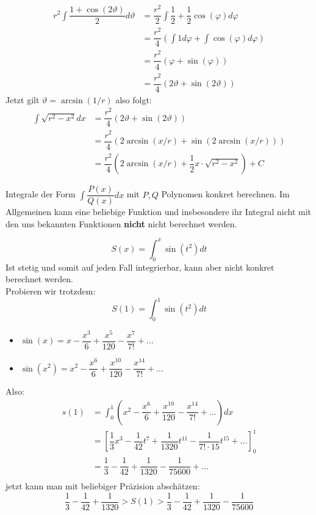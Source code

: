 \documentclass[main.tex]{subfiles}
\begin{document}
\begin{Beispiel}
\begin{itemize}
      \begin{align*}
        r^2 \int \dfrac{1 + \cos(2\vartheta)}{2} d \vartheta &= \dfrac{r^2}{2} \int \dfrac{1}{2} + \dfrac{1}{2}\cos(\varphi)d \varphi\\
        &= \dfrac{r^2}{4} \left( \int 1 d \varphi + \int\cos(\varphi)d \varphi \right)\\
        &= \dfrac{r^2}{4} (\varphi + \sin(\varphi))\\
        &= \dfrac{r^2}{4} (2 \vartheta + \sin(2 \vartheta))
      \end{align*}
      Jetzt gilt $\vartheta = \arcsin(1/r)$ also folgt:
      \begin{align*}
        \int\sqrt{r^2 - x^2} dx &= \dfrac{r^2}{4} (2 \vartheta + \sin(2 \vartheta))\\
        &= \dfrac{r^2}{4}(2 \arcsin(x/r) + \sin(2 \arcsin(x/r)))\\
        &= \dfrac{r^2}{4}(2 \arcsin(x/r) + \dfrac{1}{2} x \cdot\sqrt{r^2-x^2})+C
      \end{align*}
  \end{itemize}
\end{Beispiel}

\begin{Theorem}
  Integrale der Form $\int \dfrac{P(x)}{Q(x)} dx$ mit $P,Q$ Polynomen konkret berechnen. Im Allgemeinen kann eine beliebige Funktion und insbesondere ihr Integral nicht mit den uns bekannten Funktionen \textbf{nicht} nicht berechnet werden.
\end{Theorem}

\begin{Beispiel}
  $$S(x) = \int_0^x \sin(t^2)dt$$
  Ist stetig und somit auf jeden Fall integrierbar, kann aber nicht konkret berechnet werden.\\
  Probieren wir trotzdem:
  $$S(1) = \int_0^1 \sin(t^2)dt$$
  \begin{itemize}
    \item $\sin(x) = x - \dfrac{x^3}{6} + \dfrac{x^5}{120} - \dfrac{x^7}{7!} + ...$
    \item $\sin(x^2) = x^2 - \dfrac{x^6}{6} + \dfrac{x^10}{120} - \dfrac{x^14}{7!} + ...$
  \end{itemize}
  Also:
  \begin{align*}
    s(1) &= \int_0^1 \left( x^2 - \dfrac{x^6}{6} + \dfrac{x^10}{120} - \dfrac{x^14}{7!} + ...\right)dx\\
    &=\left[ \dfrac{1}{3}x^3 - \dfrac{1}{42}t^7 + \dfrac{1}{1320}t^11 - \dfrac{1}{7! \cdot 15}t^15 + ... \right]_0^1\\
    &= \dfrac{1}{3} - \dfrac{1}{42} + \dfrac{1}{1320} - \dfrac{1}{75600} + ...\\
  \end{align*}
  jetzt kann man mit beliebiger Präzision abschätzen:
  $$\dfrac{1}{3} - \dfrac{1}{42} + \dfrac{1}{1320} > S(1) > \dfrac{1}{3} - \dfrac{1}{42} + \dfrac{1}{1320} - \dfrac{1}{75600}$$
\end{Beispiel}
\end{document}
